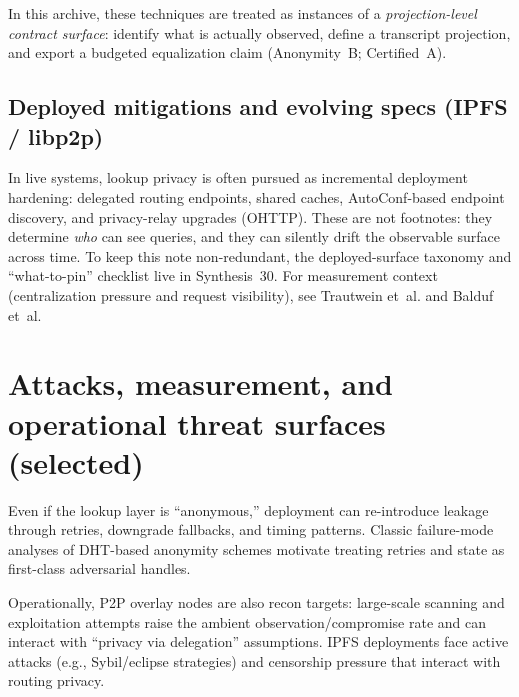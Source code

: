 \documentclass[11pt]{article}
\begin{document}
In this archive, these techniques are treated as instances of a \emph{projection-level contract surface}: identify what is actually observed, define a transcript projection, and export a budgeted equalization claim (Anonymity~B; Certified~A).\cite{series:profiling,series:certmenus}

\subsection{Deployed mitigations and evolving specs (IPFS / libp2p)}
In live systems, lookup privacy is often pursued as incremental deployment hardening: delegated routing endpoints, shared caches, AutoConf-based endpoint discovery, and privacy-relay upgrades (OHTTP).
These are not footnotes: they determine \emph{who} can see queries, and they can silently drift the observable surface across time.
To keep this note non-redundant, the deployed-surface taxonomy and ``what-to-pin'' checklist live in Synthesis~30.\cite{series:deployedsurfaces}
For measurement context (centralization pressure and request visibility), see Trautwein et~al. and Balduf et~al.\cite{trautweinIPFS2022,balduf_cloud_strikes_back}

\section{Attacks, measurement, and operational threat surfaces (selected)}
Even if the lookup layer is ``anonymous,'' deployment can re-introduce leakage through retries, downgrade fallbacks, and timing patterns.
Classic failure-mode analyses of DHT-based anonymity schemes motivate treating retries and state as first-class adversarial handles.\cite{tran2009failure,odonnell2004chord}

Operationally, P2P overlay nodes are also recon targets: large-scale scanning and exploitation attempts raise the ambient observation/compromise rate and can interact with ``privacy via delegation'' assumptions.\cite{seidenbergerMaitiRecon2024}
IPFS deployments face active attacks (e.g., Sybil/eclipse strategies) and censorship pressure that interact with routing privacy.\cite{cholezSybilIPFSARES2024,nettoSybilIPFSDHT2025,sridharIPFSCensorshipNDSS2024,matterTranIPFSCensorship2025}
\end{document}
